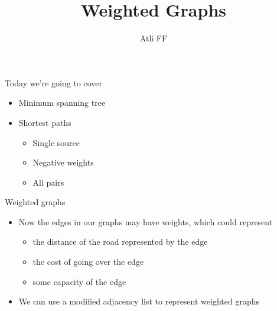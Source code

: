 \documentclass{beamer}
\title{Weighted Graphs}
\author{Atli FF}
\institute{\href{http://ru.is/td}{School of Computer Science} \\[2pt] \href{http://ru.is}{Reykjavík University}}
\begin{document}
\maketitle

\begin{frame}[plain]{Today we're going to cover}
    \begin{itemize}
        \item Minimum spanning tree
        \item Shortest paths
        \begin{itemize}
        \item Single source
        \item Negative weights
        \item All pairs
        \end{itemize}
    \end{itemize}
\end{frame}

\begin{frame}[plain]{Weighted graphs}
    \begin{itemize}
        \item Now the edges in our graphs may have weights, which could represent
            \begin{itemize}
                \item the distance of the road represented by the edge
                \item the cost of going over the edge
                \item some capacity of the edge
            \end{itemize}

        \item We can use a modified adjacency list to represent weighted graphs
    \end{itemize}
\end{frame}
\end{document}
